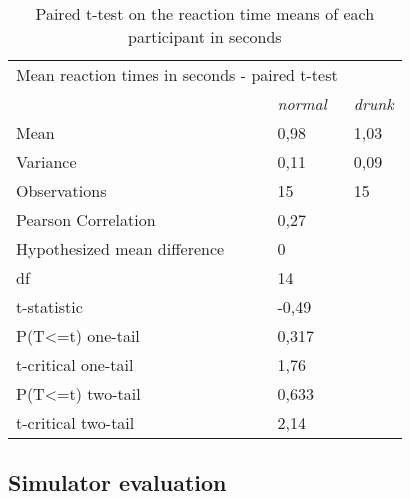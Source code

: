 \begin{table}[]
\centering
\begin{tabular}{lll}
\multicolumn{2}{l}{Mean reaction times in seconds - paired t-test}                       &                \\
\multicolumn{1}{c|}{\textit{}}                    & \multicolumn{1}{l|}{\textit{normal}} & \textit{drunk} \\ \hline
\multicolumn{1}{l|}{Mean}                         & \multicolumn{1}{l|}{0,98}            & 1,03           \\
\multicolumn{1}{l|}{Variance}                     & \multicolumn{1}{l|}{0,11}            & 0,09           \\
\multicolumn{1}{l|}{Observations}                 & \multicolumn{1}{l|}{15}              & 15             \\
\multicolumn{1}{l|}{Pearson Correlation}          & \multicolumn{1}{l|}{0,27}            &                \\
\multicolumn{1}{l|}{Hypothesized mean difference} & \multicolumn{1}{l|}{0}               &                \\
\multicolumn{1}{l|}{df}                           & \multicolumn{1}{l|}{14}              &                \\
\multicolumn{1}{l|}{t-statistic}                  & \multicolumn{1}{l|}{-0,49}           &                \\
\multicolumn{1}{l|}{P(T\textless{}=t) one-tail}   & \multicolumn{1}{l|}{0,317}           &                \\
\multicolumn{1}{l|}{t-critical one-tail}          & \multicolumn{1}{l|}{1,76}            &                \\
\multicolumn{1}{l|}{P(T\textless{}=t) two-tail}   & \multicolumn{1}{l|}{0,633}           &                \\
\multicolumn{1}{l|}{t-critical two-tail}          & \multicolumn{1}{l|}{2,14}            &               
\end{tabular}
\caption{Paired t-test on the reaction time means of each participant in seconds}
\label{table:reaction t-test}
\end{table}


\subsection{Simulator evaluation}
\label{subsection:simulator evaluation}

